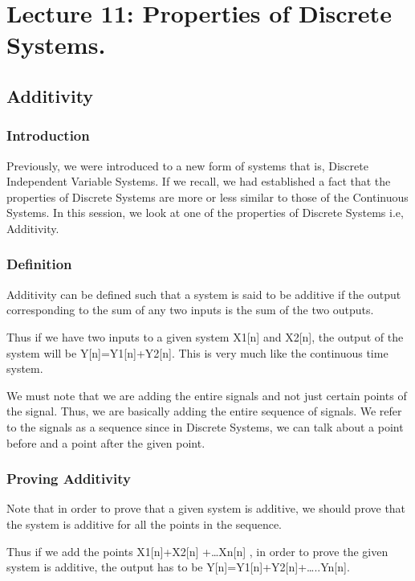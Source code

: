 \section{Lecture 11: Properties of Discrete Systems.}


\subsection{Additivity}

\subsubsection{Introduction}

Previously, we were introduced to a new form of systems that is, Discrete Independent Variable Systems. 
If we recall, we had established a fact that the properties of Discrete Systems are more or less similar to those of the Continuous Systems. In this session, we look at one of the properties of Discrete Systems i.e, Additivity. 



\subsubsection{Definition}
Additivity can be defined such that a system is said to be additive if the output corresponding to the sum of any two inputs is the sum of the two outputs.

Thus if we have two inputs to a given system X1[n] and X2[n], the output of the system will be Y[n]=Y1[n]+Y2[n]. This is very much like the continuous time system.

We must note that we are adding the entire signals and not just certain points of the signal. Thus, we are basically adding the entire sequence of signals. We refer to the signals as a sequence since in Discrete Systems, we can talk about a point before and a point after the given point.

\subsubsection{Proving Additivity}
Note that in order to prove that a given system is additive, we should prove that the system is additive for all the points in the sequence. 

Thus if we add the points X1[n]+X2[n] +…Xn[n] , in order to prove the given system is additive, the output has to be Y[n]=Y1[n]+Y2[n]+…..Yn[n].

